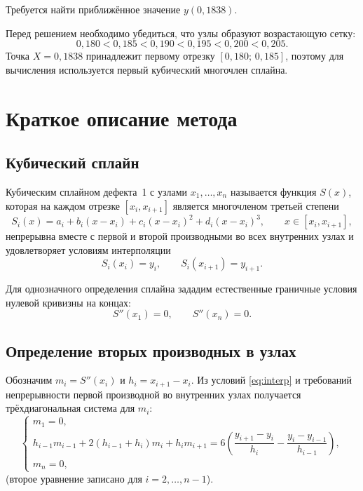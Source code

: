 \documentclass[14pt,a4paper]{extarticle}
\begin{document}
Требуется найти приближённое значение $y(0{,}1838)$.

Перед решением необходимо убедиться, что узлы образуют возрастающую
сетку:
\[
    0{,}180 < 0{,}185 < 0{,}190 < 0{,}195 < 0{,}200 < 0{,}205 .
\]
Точка $X=0{,}1838$ принадлежит первому отрезку
$[0{,}180;\,0{,}185]$, поэтому для вычисления используется первый
кубический многочлен сплайна.

\section{Краткое описание метода}

\subsection{Кубический сплайн}

Кубическим сплайном дефекта~1 с узлами $x_1,\ldots,x_n$ называется
функция $S(x)$, которая на каждом отрезке $[x_i,x_{i+1}]$ является
многочленом третьей степени
\begin{equation}
    S_i(x)=a_i+b_i(x-x_i)+c_i(x-x_i)^2+d_i(x-x_i)^3,
    \qquad x\in[x_i,x_{i+1}],
    \label{eq:spline}
\end{equation}
непрерывна вместе с первой и второй производными во всех внутренних
узлах и удовлетворяет условиям интерполяции
\begin{equation}
    S_i(x_i)=y_i,\qquad S_i(x_{i+1})=y_{i+1}.
    \label{eq:interp}
\end{equation}

Для однозначного определения сплайна зададим естественные граничные
условия нулевой кривизны на концах:
\begin{equation}
    S''(x_1)=0,\qquad S''(x_n)=0.
    \label{eq:natural}
\end{equation}

\subsection{Определение вторых производных в узлах}

Обозначим $m_i=S''(x_i)$ и $h_i=x_{i+1}-x_i$. Из условий
\eqref{eq:interp} и требований непрерывности первой производной во
внутренних узлах получается трёхдиагональная система для $m_i$:
\begin{equation}
    \begin{cases}
        m_1=0,\\[2mm]
        h_{i-1}m_{i-1}+2(h_{i-1}+h_i)m_i+h_i m_{i+1}
        =6\left(\dfrac{y_{i+1}-y_i}{h_i}
        -\dfrac{y_i-y_{i-1}}{h_{i-1}}\right),\\[3mm]
        m_n=0,
    \end{cases}
    \label{eq:system}
\end{equation}
(второе уравнение записано для $i=2,\ldots,n-1$).
\end{document}
